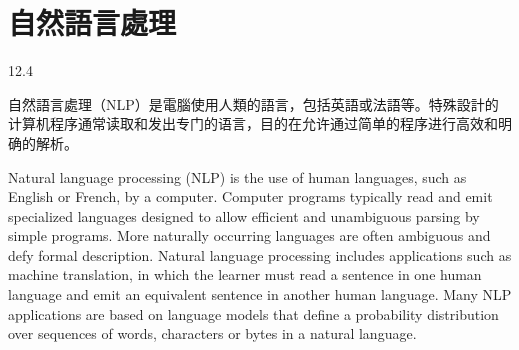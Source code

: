 

\section{自然語言處理}{12.4}

自然語言處理（NLP）是電腦使用人類的語言，包括英語或法語等。特殊設計的计算机程序通常读取和发出专门的语言，目的在允许通过简单的程序进行高效和明确的解析。

Natural language processing (NLP) is the use of human languages, such as English or French, by a computer. Computer programs typically read and emit specialized languages designed to allow efficient and unambiguous parsing by simple programs. More naturally occurring languages are often ambiguous and defy formal description. Natural language processing includes applications such as machine translation, in which the learner must read a sentence in one human language and emit an equivalent sentence in another human language. Many NLP applications are based on language models that define a probability distribution over sequences of words, characters or bytes in a natural language.



